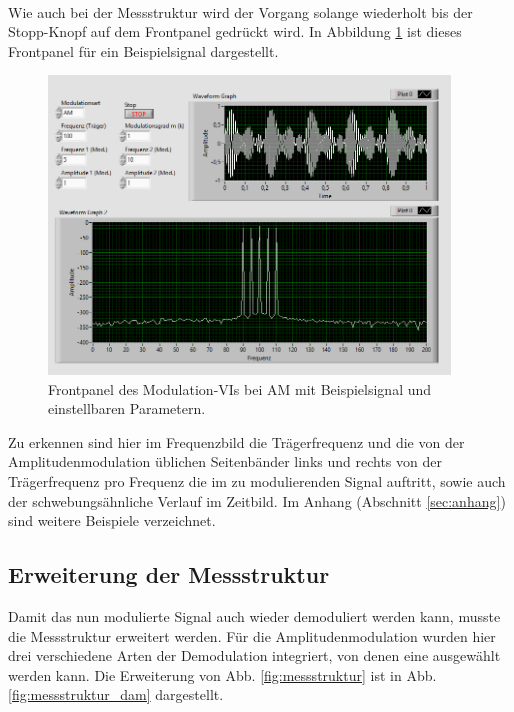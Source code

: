 \

Wie auch bei der Messstruktur wird der Vorgang solange wiederholt bis der Stopp-Knopf auf dem Frontpanel gedrückt wird.  
In Abbildung \ref{fig:am_example} ist dieses Frontpanel für ein Beispielsignal dargestellt.

\begin{figure}[H]
	\centering
	\includegraphics[width=0.95\textwidth]{pic/am_example.png}
	\caption{Frontpanel des Modulation-VIs bei AM mit Beispielsignal und einstellbaren Parametern.}
	\label{fig:am_example}	
\end{figure} 

Zu erkennen sind hier im Frequenzbild die Trägerfrequenz und die von der Amplitudenmodulation üblichen Seitenbänder links und rechts von der Trägerfrequenz pro Frequenz die im zu modulierenden Signal auftritt, sowie auch der schwebungsähnliche Verlauf im Zeitbild.
Im Anhang (Abschnitt \ref*{sec:anhang}) sind weitere Beispiele verzeichnet.



\subsection{Erweiterung der Messstruktur}

Damit das nun modulierte Signal auch wieder demoduliert werden kann, musste die Messstruktur erweitert werden.
Für die Amplitudenmodulation wurden hier drei verschiedene Arten der Demodulation integriert, von denen eine ausgewählt werden kann.
Die Erweiterung von Abb. \ref{fig:messstruktur} ist in Abb. \ref{fig:messstruktur_dam} dargestellt.
	
\

